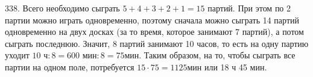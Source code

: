 338. Всего необходимо сыграть $5+4+3+2+1=15$ партий. При этом по 2 партии можно играть одновременно, поэтому сначала можно сыграть 14 партий одновременно на двух досках (за то время, которое занимают 7 партий), а потом сыграть последнюю. Значит, 8 партий занимают 10 часов, то есть на одну партию уходит $10\text{ ч}:8= 600\text{ мин}:8=75$мин. Таким образом, на то, чтобы сыграть все партии на одном поле, потребуется $15\cdot75=1125$мин или 18 ч 45 мин.
\newpage
